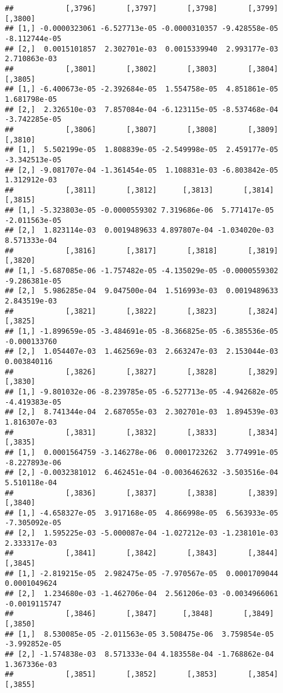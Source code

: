 \documentclass[
]{article}
\begin{document}
\begin{verbatim}
##            [,3796]       [,3797]       [,3798]       [,3799]       [,3800]
## [1,] -0.0000323061 -6.527713e-05 -0.0000310357 -9.428558e-05 -8.112744e-05
## [2,]  0.0015101857  2.302701e-03  0.0015339940  2.993177e-03  2.710863e-03
##            [,3801]       [,3802]       [,3803]       [,3804]       [,3805]
## [1,] -6.400673e-05 -2.392684e-05  1.554758e-05  4.851861e-05  1.681798e-05
## [2,]  2.326510e-03  7.857084e-04 -6.123115e-05 -8.537468e-04 -3.742285e-05
##            [,3806]       [,3807]       [,3808]       [,3809]       [,3810]
## [1,]  5.502199e-05  1.808839e-05 -2.549998e-05  2.459177e-05 -3.342513e-05
## [2,] -9.081707e-04 -1.361454e-05  1.108831e-03 -6.803842e-05  1.312912e-03
##            [,3811]       [,3812]      [,3813]       [,3814]       [,3815]
## [1,] -5.323803e-05 -0.0000559302 7.319686e-06  5.771417e-05 -2.011563e-05
## [2,]  1.823114e-03  0.0019489633 4.897807e-04 -1.034020e-03  8.571333e-04
##            [,3816]       [,3817]       [,3818]       [,3819]       [,3820]
## [1,] -5.687085e-06 -1.757482e-05 -4.135029e-05 -0.0000559302 -9.286381e-05
## [2,]  5.986285e-04  9.047500e-04  1.516993e-03  0.0019489633  2.843519e-03
##            [,3821]       [,3822]       [,3823]       [,3824]      [,3825]
## [1,] -1.899659e-05 -3.484691e-05 -8.366825e-05 -6.385536e-05 -0.000133760
## [2,]  1.054407e-03  1.462569e-03  2.663247e-03  2.153044e-03  0.003840116
##            [,3826]       [,3827]       [,3828]       [,3829]       [,3830]
## [1,] -9.801032e-06 -8.239785e-05 -6.527713e-05 -4.942682e-05 -4.419383e-05
## [2,]  8.741344e-04  2.687055e-03  2.302701e-03  1.894539e-03  1.816307e-03
##            [,3831]       [,3832]       [,3833]       [,3834]       [,3835]
## [1,]  0.0001564759 -3.146278e-06  0.0001723262  3.774991e-05 -8.227893e-06
## [2,] -0.0032381012  6.462451e-04 -0.0036462632 -3.503516e-04  5.510118e-04
##            [,3836]       [,3837]       [,3838]       [,3839]       [,3840]
## [1,] -4.658327e-05  3.917168e-05  4.866998e-05  6.563933e-05 -7.305092e-05
## [2,]  1.595225e-03 -5.000087e-04 -1.027212e-03 -1.238101e-03  2.333317e-03
##            [,3841]       [,3842]       [,3843]       [,3844]       [,3845]
## [1,] -2.819215e-05  2.982475e-05 -7.970567e-05  0.0001709044  0.0001049624
## [2,]  1.234680e-03 -1.462706e-04  2.561206e-03 -0.0034966061 -0.0019115747
##            [,3846]       [,3847]      [,3848]       [,3849]       [,3850]
## [1,]  8.530085e-05 -2.011563e-05 3.508475e-06  3.759854e-05 -3.992852e-05
## [2,] -1.574838e-03  8.571333e-04 4.183558e-04 -1.768862e-04  1.367336e-03
##            [,3851]       [,3852]       [,3853]       [,3854]       [,3855]

\end{verbatim}
\end{document}
